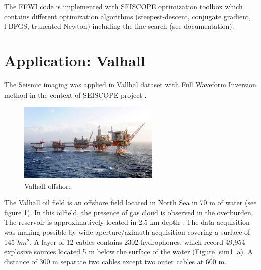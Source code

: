 The FFWI code is implemented with SEISCOPE optimization toolbox which contains different optimization algorithms (steepest-descent, conjugate gradient, l-BFGS, truncated Newton) including the line search (see documentation).

\section{Application: Valhall}
The Seismic imaging was applied in Vallhal dataset with Full Waveform Inversion method in the context of SEISCOPE project \cite{Operto2014, Operto2015, Amestoy2016}.
\begin{figure}[!h]
\centering 
\includegraphics[width=0.6\textwidth]{images/valhall.jpg}
\caption{Valhall offshore}
\label{valhall} 
\end{figure}
The Valhall oil field is an offshore field located in North Sea in 70 m of water (see figure \ref{valhall}). In this oilfield, the presence of gas cloud is observed in the overburden. The reservoir is approximatively located in 2.5 km depth \cite{Barkved2010}. The data acquisition was making possible by wide aperture/azimuth acquisition covering a surface of 145 $km^{2}$. A layer of 12 cables contains 2302 hydrophones, which record 49,954 explosive sources located 5 m below the surface of the water (Figure \ref{sim1}.a). A distance of 300 m separate two cables except two outer cables at 600 m. 
